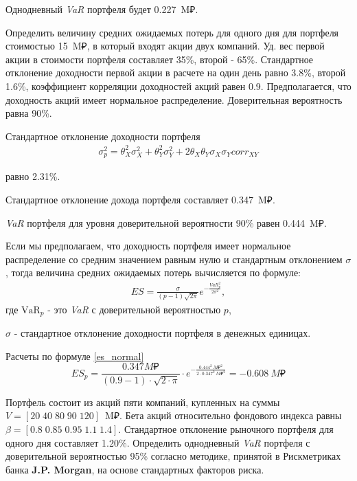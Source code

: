 \documentclass[12pt, table, twoside, a4paper]{exam}
\begin{document}
\begin{questions}
\begin{solution}[6em]
		Однодневный \textit{VaR} портфеля будет 0.227~M₽.
	\end{solution}
	
	
	\pagebreak
	\question[10] Определить величину средних ожидаемых потерь для одного дня для портфеля стоимостью 15~M₽, в который входят акции двух компаний. Уд. вес первой акции в стоимости портфеля составляет 35\%, второй - 65\%. Стандартное отклонение доходности первой акции в расчете на один день равно 3.8\%, второй 1.6\%, коэффициент корреляции доходностей акций равен 0.9. Предполагается, что доходность акций имеет нормальное распределение. Доверительная вероятность равна 90\%.
	
	\begin{solution}[12em]
		
		\raggedright
		Стандартное отклонение доходности портфеля 
		\begin{align}
		\sigma_p^2=\theta_X^2\sigma_X^2+\theta_Y^2\sigma_Y^2+2\theta_X\theta_Y\sigma_X\sigma_Y corr_{XY}
		\end{align}
		
		равно 2.31\%.
		
		Стандартное отклонение дохода портфеля составляет 0.347~M₽.
		
		\textit{VaR} портфеля для уровня доверительной вероятности 90\% равен 0.444~M₽.
		
		Если мы предполагаем, что доходность портфеля имеет нормальное распределение со средним значением равным нулю и стандартным отклонением $\sigma$, тогда величина средних ожидаемых потерь вычисляется по формуле:
		\begin{align}
		\label{es_normal}
		ES=\frac{\sigma}{(p-1)\sqrt{2\pi}}e^{-\frac{VaR_{p}^2}{2\sigma^2}},
		\end{align}
		где 
		$\mbox{VaR}_{p}$ - это \textit{VaR} с доверительной вероятностью $p$,
		
		$\sigma$ - стандартное отклонение доходности портфеля в денежных единицах.
		
		Расчеты по формуле \eqref{es_normal} 
		$$ES_{p}=\frac{0.347M₽}{(0.9 - 1)\cdot \sqrt{2 \cdot \pi}}\cdot e^{-\frac{0.444^2~M₽^2}{2 \cdot 0.347^2~M₽^2}}=-0.608~M₽$$		
	\end{solution}
	
	\question[10] Портфель состоит из акций пяти компаний, купленных на суммы   $V=[20\;40\;80\;90\;120]$~M₽. Бета акций относительно фондового индекса равны $\beta=[0.8\;0.85\;0.95\;1.1\;1.4]$. Стандартное отклонение рыночного портфеля для одного дня составляет 1.20\%. Определить однодневный  \textit{VaR }портфеля с доверительной вероятностью 95\% согласно методике, принятой в Рискметриках банка \textbf{J.P. Morgan}, на основе стандартных факторов риска. 
	

\end{questions}
\end{document}

